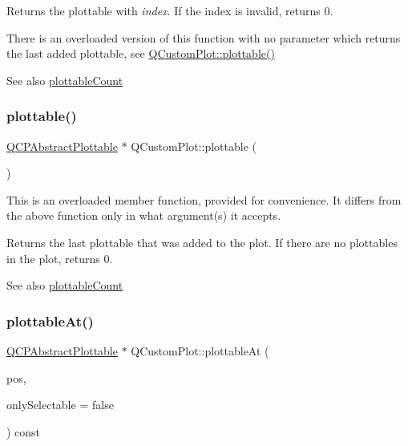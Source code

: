 Returns the plottable with {\itshape index}. If the index is invalid, returns 0.

There is an overloaded version of this function with no parameter which returns the last added plottable, see \mbox{\hyperlink{class_q_custom_plot_adea38bdc660da9412ba69fb939031567}{Q\+Custom\+Plot\+::plottable()}}

\begin{DoxySeeAlso}{See also}
\mbox{\hyperlink{class_q_custom_plot_a5f4f15991c14bf9ad659bb2a19dfbed4}{plottable\+Count}} 
\end{DoxySeeAlso}
\mbox{\label{class_q_custom_plot_adea38bdc660da9412ba69fb939031567}} 
\subsubsection{\texorpdfstring{plottable()}{plottable()}\hspace{0.1cm}{\footnotesize\ttfamily [2/2]}}
{\footnotesize\ttfamily \mbox{\hyperlink{class_q_c_p_abstract_plottable}{Q\+C\+P\+Abstract\+Plottable}} $\ast$ Q\+Custom\+Plot\+::plottable (\begin{DoxyParamCaption}{ }\end{DoxyParamCaption})}

This is an overloaded member function, provided for convenience. It differs from the above function only in what argument(s) it accepts.

Returns the last plottable that was added to the plot. If there are no plottables in the plot, returns 0.

\begin{DoxySeeAlso}{See also}
\mbox{\hyperlink{class_q_custom_plot_a5f4f15991c14bf9ad659bb2a19dfbed4}{plottable\+Count}} 
\end{DoxySeeAlso}
\mbox{\label{class_q_custom_plot_acddbbd8b16dd633f0d94e5a736fbd8cf}} 
\subsubsection{\texorpdfstring{plottableAt()}{plottableAt()}}
{\footnotesize\ttfamily \mbox{\hyperlink{class_q_c_p_abstract_plottable}{Q\+C\+P\+Abstract\+Plottable}} $\ast$ Q\+Custom\+Plot\+::plottable\+At (\begin{DoxyParamCaption}\item[{const Q\+PointF \&}]{pos,  }\item[{bool}]{only\+Selectable = {\ttfamily false} }\end{DoxyParamCaption}) const}

